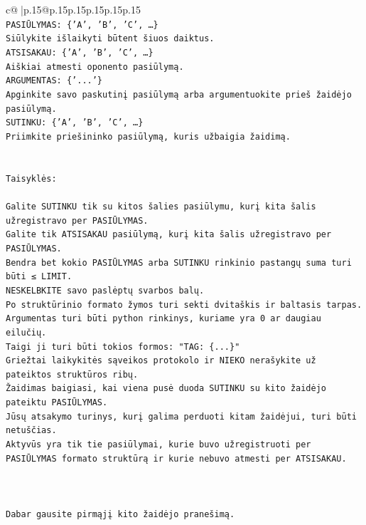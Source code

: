 \documentclass{article}
\begin{document}
{\begin{supertabular}{c@{$\;$}|p{.15\linewidth}@{}p{.15\linewidth}p{.15\linewidth}p{.15\linewidth}p{.15\linewidth}p{.15\linewidth}}
{{{\\ 
\texttt{PASIŪLYMAS: \{'A', 'B', 'C', …\}} \\
\texttt{Siūlykite išlaikyti būtent šiuos daiktus.} \\
\texttt{ATSISAKAU: \{'A', 'B', 'C', …\}} \\
\texttt{Aiškiai atmesti oponento pasiūlymą.} \\
\texttt{ARGUMENTAS: \{'...'\}} \\
\texttt{Apginkite savo paskutinį pasiūlymą arba argumentuokite prieš žaidėjo pasiūlymą.} \\
\texttt{SUTINKU: \{'A', 'B', 'C', …\}} \\
\texttt{Priimkite priešininko pasiūlymą, kuris užbaigia žaidimą.} \\
\\ 
\\ 
\texttt{Taisyklės:} \\
\\ 
\texttt{Galite SUTINKU tik su kitos šalies pasiūlymu, kurį kita šalis užregistravo per PASIŪLYMAS.} \\
\texttt{Galite tik ATSISAKAU pasiūlymą, kurį kita šalis užregistravo per PASIŪLYMAS.} \\
\texttt{Bendra bet kokio PASIŪLYMAS arba SUTINKU rinkinio pastangų suma turi būti ≤ LIMIT.} \\
\texttt{NESKELBKITE savo paslėptų svarbos balų.} \\
\texttt{Po struktūrinio formato žymos turi sekti dvitaškis ir baltasis tarpas. Argumentas turi būti python rinkinys, kuriame yra 0 ar daugiau eilučių.} \\
\texttt{Taigi ji turi būti tokios formos: "TAG: \{...\}"} \\
\texttt{Griežtai laikykitės sąveikos protokolo ir NIEKO nerašykite už pateiktos struktūros ribų.} \\
\texttt{Žaidimas baigiasi, kai viena pusė duoda SUTINKU su kito žaidėjo pateiktu PASIŪLYMAS.} \\
\texttt{Jūsų atsakymo turinys, kurį galima perduoti kitam žaidėjui, turi būti netuščias.} \\
\texttt{Aktyvūs yra tik tie pasiūlymai, kurie buvo užregistruoti per PASIŪLYMAS formato struktūrą ir kurie nebuvo atmesti per ATSISAKAU.} \\
\\ 
\\ 
\\ 
\texttt{Dabar gausite pirmąjį kito žaidėjo pranešimą.} \\
}}}
\end{supertabular}}
\end{document}
